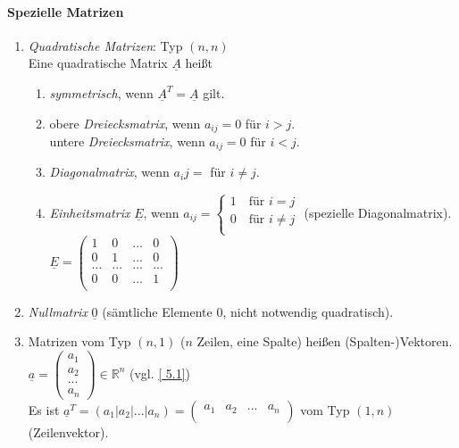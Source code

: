 \paragraph{Spezielle Matrizen}
\begin{enumerate}
\item \emph{Quadratische Matrizen}: Typ $(n,n)$\\
Eine quadratische Matrix $\underline{A}$ heißt
\begin{enumerate}
\item \emph{symmetrisch}, wenn $\underline{A}^T=\underline{A}$ gilt.
\item obere \emph{Dreiecksmatrix}, wenn $a_{ij}=0$ für $i>j$.\\
untere \emph{Dreiecksmatrix}, wenn $a_{ij}=0$ für $i<j$.
\item \emph{Diagonalmatrix}, wenn $a_ij=$ für $i\not = j$.
\item \emph{Einheitsmatrix} $\underline{E}$, wenn $a_{ij}=\begin{cases}
1 \quad \text{für }i=j\\
0 \quad \text{für } i \not = j\\
\end{cases}$ (spezielle Diagonalmatrix). \\
$\underline{E}=\begin{pmatrix}
1 & 0 & ... &0 \\
0 & 1 & ... &0 \\
... &... & ... & ...\\
0 & 0 & ... & 1 \\
\end{pmatrix}$
\end{enumerate}
\item \emph{Nullmatrix} $\underline{0}$ (sämtliche Elemente $0$, nicht notwendig quadratisch).
\item Matrizen vom Typ $(n,1)$ ($n$ Zeilen, eine Spalte) heißen (Spalten-)Vektoren.\\
$\underline{a}=\begin{pmatrix}
a_1\\
a_2\\
...\\
a_n
\end{pmatrix} \in \mathbb{R}^n$ (vgl. \ref{ 5.1})\\
Es ist $\underline{a}^T=(a_1| a _2 | ... | a_n)=\begin{pmatrix}
a_1 & a_2 & ... & a_n\\
\end{pmatrix}$ vom Typ $(1,n)$ (Zeilenvektor).
\end{enumerate}
